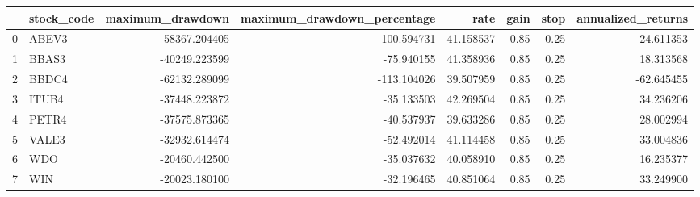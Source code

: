 \begin{tabular}{llrrrrrr}
\toprule
{} & stock\_code &  maximum\_drawdown &  maximum\_drawdown\_percentage &       rate &  gain &  stop &  annualized\_returns \\
\midrule
0 &      ABEV3 &     -58367.204405 &                  -100.594731 &  41.158537 &  0.85 &  0.25 &          -24.611353 \\
1 &      BBAS3 &     -40249.223599 &                   -75.940155 &  41.358936 &  0.85 &  0.25 &           18.313568 \\
2 &      BBDC4 &     -62132.289099 &                  -113.104026 &  39.507959 &  0.85 &  0.25 &          -62.645455 \\
3 &      ITUB4 &     -37448.223872 &                   -35.133503 &  42.269504 &  0.85 &  0.25 &           34.236206 \\
4 &      PETR4 &     -37575.873365 &                   -40.537937 &  39.633286 &  0.85 &  0.25 &           28.002994 \\
5 &      VALE3 &     -32932.614474 &                   -52.492014 &  41.114458 &  0.85 &  0.25 &           33.004836 \\
6 &        WDO &     -20460.442500 &                   -35.037632 &  40.058910 &  0.85 &  0.25 &           16.235377 \\
7 &        WIN &     -20023.180100 &                   -32.196465 &  40.851064 &  0.85 &  0.25 &           33.249900 \\
\bottomrule
\end{tabular}

